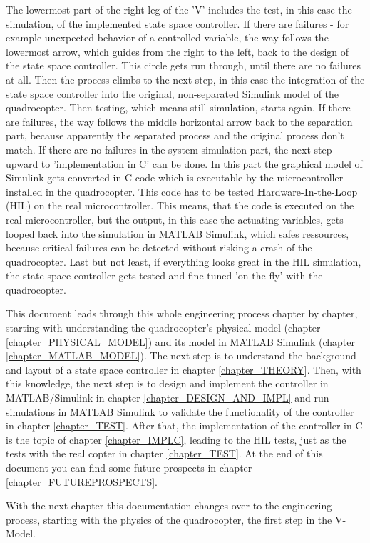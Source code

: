The lowermost part of the right leg of the 'V' includes the test, in this case the simulation, of the implemented state space controller. If there are failures - for example unexpected behavior of a controlled variable, the way follows the lowermost arrow, which guides from the right to the left, back to the design of the state space controller. This circle gets run through, until there are no failures at all. Then the process climbs to the next step, in this case the integration of the state space controller into the original, non-separated Simulink model of the quadrocopter. Then testing, which means still simulation, starts again. If there are failures, the way follows the middle horizontal arrow back to the separation part, because apparently the separated process and the original process don't match. If there are no failures in the system-simulation-part, the next step upward to 'implementation in C' can be done. In this part the graphical model of Simulink gets converted in C-code which is executable by the microcontroller installed in the quadrocopter. This code has to be tested \textbf{H}ardware-\textbf{I}n-the-\textbf{L}oop (HIL) on the real microcontroller. This means, that the code is executed on the real microcontroller, but the output, in this case the actuating variables, gets looped back into the simulation in MATLAB Simulink, which safes ressources, because critical failures can be detected without risking a crash of the quadrocopter. Last but not least, if everything looks great in the HIL simulation, the state space controller gets tested and fine-tuned 'on the fly' with the quadrocopter.

This document leads through this whole engineering process chapter by chapter, starting with understanding the quadrocopter's physical model (chapter \ref{chapter_PHYSICAL_MODEL}) and its model in MATLAB Simulink (chapter \ref{chapter_MATLAB_MODEL}). The next step is to understand the background and layout of a state space controller in chapter \ref{chapter_THEORY}. Then, with this knowledge, the next step is to design and implement the controller in MATLAB/Simulink in chapter \ref{chapter_DESIGN_AND_IMPL} and run simulations in MATLAB Simulink to validate the functionality of the controller in chapter \ref{chapter_TEST}. After that, the implementation of the controller in C is the topic of chapter \ref{chapter_IMPLC}, leading to the HIL tests, just as the tests with the real copter in chapter \ref{chapter_TEST}.
At the end of this document you can find some future prospects in chapter \ref{chapter_FUTUREPROSPECTS}.

With the next chapter this documentation changes over to the engineering process, starting with the physics of the quadrocopter, the first step in the V-Model.